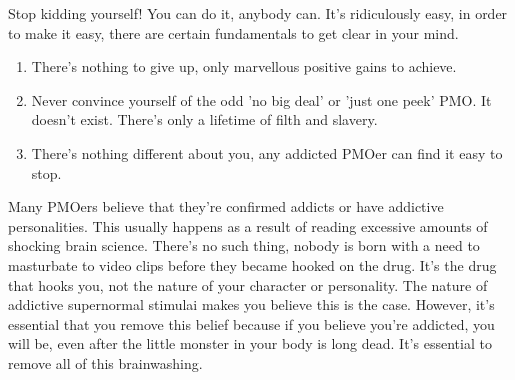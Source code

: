 \documentclass[easypeasy.tex]{subfiles}
\begin{document}
Stop kidding yourself! You can do it, anybody can. It's ridiculously easy, in order to make it easy, there are certain fundamentals to get clear in your mind.

\begin{enumerate}
  \item There's nothing to give up, only marvellous positive gains to achieve.
  \item Never convince yourself of the odd 'no big deal' or 'just one peek' PMO. It doesn't exist. There's only a lifetime of filth and slavery.
  \item There's nothing different about you, any addicted PMOer can find it easy to stop.
\end{enumerate}

Many PMOers believe that they're confirmed addicts or have addictive personalities. This usually happens as a result of reading excessive amounts of shocking brain science. There's no such thing, nobody is born with a need to masturbate to video clips before they became hooked on the drug. It's the drug that hooks you, not the nature of your character or personality. The nature of addictive supernormal stimulai makes you believe this is the case. However, it's essential that you remove this belief because if you believe you're addicted, you will be, even after the little monster in your body is long dead. It's essential to remove all of this brainwashing.
\end{document}
